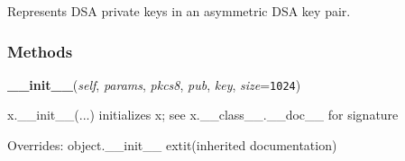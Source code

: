 Represents DSA private keys in an asymmetric DSA key pair.



  \subsubsection{Methods}

    \vspace{0.5ex}

\hspace{.8\funcindent}\begin{boxedminipage}{\funcwidth}

    \raggedright \textbf{\_\_init\_\_}(\textit{self}, \textit{params}, \textit{pkcs8}, \textit{pub}, \textit{key}, \textit{size}={\tt 1024})

\setlength{\parskip}{2ex}
    x.\_\_init\_\_(...) initializes x; see x.\_\_class\_\_.\_\_doc\_\_ for 
    signature

\setlength{\parskip}{1ex}
      Overrides: object.\_\_init\_\_ 	extit{(inherited documentation)}

    \end{boxedminipage}

    \label{keyczar:keys:DsaPrivateKey:Generate}

    \vspace{0.5ex}

